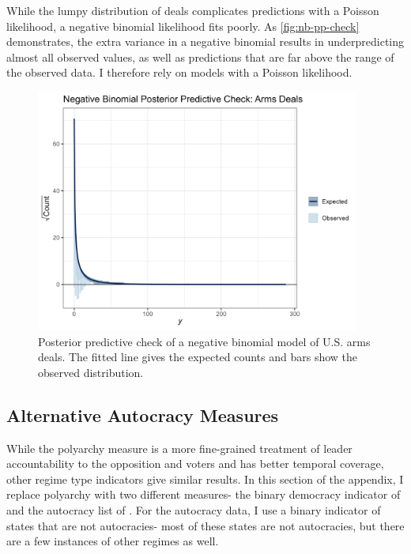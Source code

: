 \documentclass[12pt]{article}
\begin{document}
While the lumpy distribution of deals complicates predictions with a Poisson likelihood, a negative binomial likelihood fits poorly. 
As \autoref{fig:nb-pp-check} demonstrates, the extra variance in a negative binomial results in underpredicting almost all observed values, as well as predictions that are far above the range of the observed data. 
I therefore rely on models with a Poisson likelihood. 


\begin{figure}[htpb]
	\centering
		\includegraphics[width=0.95\textwidth]{nb-pp-check.png}
	\caption{Posterior predictive check of a negative binomial model of U.S. arms deals. The fitted line gives the expected counts and bars show the observed distribution.}
	\label{fig:nb-pp-check}
\end{figure}



\subsection{Alternative Autocracy Measures}

While the polyarchy measure is a more fine-grained treatment of leader accountability to the opposition and voters and has better temporal coverage, other regime type indicators give similar results.
In this section of the appendix, I replace polyarchy with two different measures- the binary democracy indicator of \citet{CGV2010} and the autocracy list of \citet{Geddes2014}.
For the autocracy data, I use a binary indicator of states that are not autocracies- most of these states are not autocracies, but there are a few instances of other regimes as well. 
\end{document}
